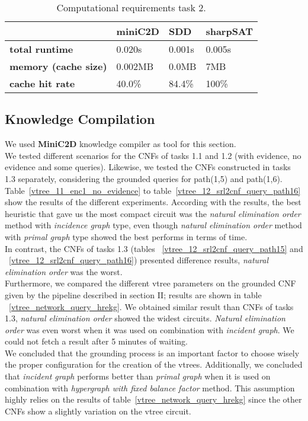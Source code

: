 \begin{table}[h]
	\centering
	\caption{Computational requirements task 2.}
	\label{table:comptask2}
	\begin{tabular}{l|l|l|l}
		\textbf{}        & \textbf{miniC2D} & \textbf{SDD} & \textbf{sharpSAT} \\ \hline
		\textbf{total runtime} &  0.020s  &   0.001s   &   0.005s  \\ \hline
		\textbf{memory (cache size)}  &  0.002MB  &   0.0MB &   7MB  \\ \hline
		\textbf{cache hit rate}  & 40.0\%  & 84.4\% &   100\%
	\end{tabular}
\end{table}

\subsection{Knowledge Compilation}\label{subsec:knowledgecompilation}

We used \textbf{MiniC2D} knowledge compiler as tool for this section.
\\[2ex]
We tested different scenarios for the CNFs of tasks 1.1 and 1.2 (with evidence, no evidence and some queries). Likewise, we tested the CNFs constructed in tasks 1.3 separately, considering the grounded queries for path(1,5) and path(1,6).
\\[2ex]
Table~\ref{vtree_11_enc1_no_evidence} to table~\ref{vtree_12_srl2cnf_query_path16} show the results of the different experiments. According with the results, the best heuristic that gave us the most compact circuit was the \textit{natural elimination order} method with \textit{incidence graph} type, even though \textit{natural elimination order} method with \textit{primal graph} type showed the best performs in terms of time.
\\[2ex]
In contrast, the CNFs of tasks 1.3 (tables ~\ref{vtree_12_srl2cnf_query_path15} and ~\ref{vtree_12_srl2cnf_query_path16}) presented difference results, \textit{natural elimination order} was the worst.
\\[2ex]
Furthermore, we compared the different vtree parameters on the grounded CNF given by the pipeline described in section II; results are shown in table ~\ref{vtree_network_query_hrekg}. We obtained similar result than CNFs of tasks 1.3, \textit{natural elimination order} showed the widest circuits. \textit{Natural elimination order} was even worst when it was used on combination with \textit{incident graph}. We could not fetch a result after 5 minutes of waiting.
\\[2ex]
We concluded that the grounding process is an important factor to choose wisely the proper configuration for the creation of the vtrees. Additionally, we concluded that \textit{incident graph} performs better than \textit{primal graph} when it is used on combination with \textit{hypergraph with fixed balance factor} method. This assumption highly relies on the results of table~\ref{vtree_network_query_hrekg} since the other CNFs show a slightly variation on the vtree circuit.
\\[2ex]

